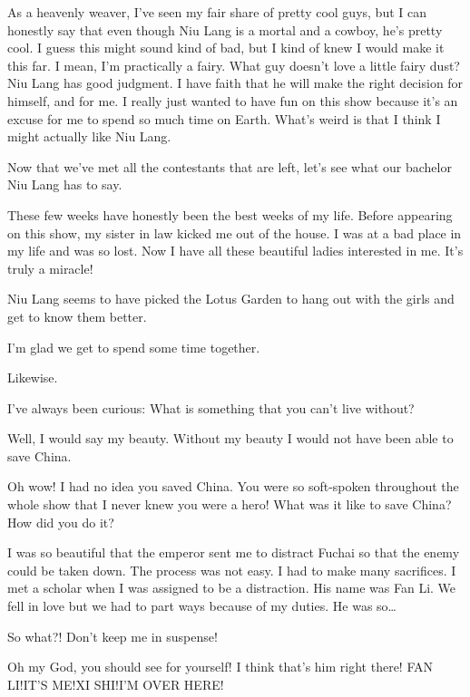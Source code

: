 \documentclass[letterpaper,12pt]{memoir}
\begin{document}
\zhinu%
As a heavenly weaver, I've seen my fair share of pretty cool guys, but I can honestly say that even though Niu Lang is a mortal and a cowboy, he's pretty cool. I guess this might sound kind of bad, but I kind of knew I would make it this far. I mean, I'm practically a fairy. What guy doesn't love a little fairy dust? Niu Lang has good judgment. I have faith that he will make the right decision for himself, and for me. I really just wanted to have fun on this show because it's an excuse for me to spend so much time on Earth. What's weird is that I think I might actually like Niu Lang.

\host%
Now that we've met all the contestants that are left, let's see what our bachelor Niu Lang has to say.

\niulang%
These few weeks have honestly been the best weeks of my life. Before appearing on this show, my sister in law kicked me out of the house. I was at a bad place in my life and was so lost. Now I have all these beautiful ladies interested in me. It's truly a miracle!


\scene{}

\host%
Niu Lang seems to have picked the Lotus Garden to hang out with the girls and get to know them better.

\niulang%
I'm glad we get to spend some time together.

\xishi%
Likewise.

\niulang%
I've always been curious: What is something that you can't live without?

\xishi%
Well, I would say my beauty. Without my beauty I would not have been able to save China.

\niulang%
Oh wow! I had no idea you saved China. You were so soft-spoken throughout the whole show that I never knew you were a hero! What was it like to save China? How did you do it?

\xishi%
I was so beautiful that the emperor sent me to distract Fuchai so that the enemy could be taken down. The process was not easy. I had to make many sacrifices. I met a scholar when I was assigned to be a distraction. His name was Fan Li. We fell in love but we had to part ways because of my duties.  He was so\dots

\niulang%
So what?! Don't keep me in suspense!

\xishi%
Oh my God, you should see for yourself! I think that's him right there! FAN LI!\@ IT'S ME!\@ XI SHI!\@ I'M OVER HERE!\@
\end{document}
